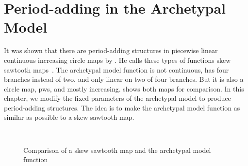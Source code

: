 \chapter{Period-adding in the Archetypal Model}
\label{chap:add}

It was shown that there are period-adding structures in piecewise linear continuous increasing circle maps by .
He calls these types of functions skew sawtooth maps~\cite{simpson2018saw}.
The archetypal model function is not continuous, has four branches instead of two, and only linear on two of four branches.
But it is also a circle map, \gls{pws}, and mostly increasing.
 shows both maps for comparison.
In this chapter, we modify the fixed parameters of the archetypal model to produce period-adding structures.
The idea is to make the archetypal model function as similar as possible to a skew sawtooth map.

\begin{figure}
	\centering
	\\
	\caption[Comparison of a skew sawtooth map and the archetypal model function]{
		Comparison of a skew sawtooth map and the archetypal model function
	}
	\label{fig:add.saw.vs.arch}
\end{figure}



